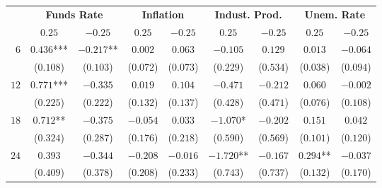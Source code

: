\documentclass{article}
\begin{document}
\begin{table}
\centering
\begin{tabular}{rcccccccc}
\hline\hline
      	& \multicolumn{2}{c}{\textbf{Funds Rate}}	& \multicolumn{2}{c}{\textbf{Inflation}}	& \multicolumn{2}{c}{\textbf{Indust. Prod.}}	& \multicolumn{2}{c}{\textbf{Unem. Rate}}\\
\cline{2-9}
      	& $      0.25$	& $     -0.25$	& $      0.25$	& $     -0.25$	& $      0.25$	& $     -0.25$	& $      0.25$	& $     -0.25$ \\
\hline
$   6$	& $   0.436$***	& $  -0.217$**	& $   0.002$	& $   0.063$	& $  -0.105$	& $   0.129$	& $   0.013$	& $  -0.064$ \\
      	& ($ 0.108$)	& ($ 0.103$)	& ($ 0.072$)	& ($ 0.073$)	& ($ 0.229$)	& ($ 0.534$)	& ($ 0.038$)	& ($ 0.094$) \\
$  12$	& $   0.771$***	& $  -0.335$	& $   0.019$	& $   0.104$	& $  -0.471$	& $  -0.212$	& $   0.060$	& $  -0.002$ \\
      	& ($ 0.225$)	& ($ 0.222$)	& ($ 0.132$)	& ($ 0.137$)	& ($ 0.428$)	& ($ 0.471$)	& ($ 0.076$)	& ($ 0.108$) \\
$  18$	& $   0.712$**	& $  -0.375$	& $  -0.054$	& $   0.033$	& $  -1.070$*	& $  -0.202$	& $   0.151$	& $   0.042$ \\
      	& ($ 0.324$)	& ($ 0.287$)	& ($ 0.176$)	& ($ 0.218$)	& ($ 0.590$)	& ($ 0.569$)	& ($ 0.101$)	& ($ 0.120$) \\
$  24$	& $   0.393$	& $  -0.344$	& $  -0.208$	& $  -0.016$	& $  -1.720$**	& $  -0.167$	& $   0.294$**	& $  -0.037$ \\
      	& ($ 0.409$)	& ($ 0.378$)	& ($ 0.208$)	& ($ 0.233$)	& ($ 0.743$)	& ($ 0.737$)	& ($ 0.132$)	& ($ 0.170$) \\
\hline\hline
\end{tabular}
\end{table}
\end{document}
